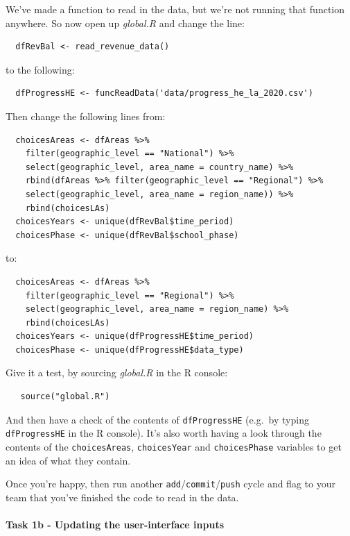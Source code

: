 \documentclass[
  12pt,
]{article}
\begin{document}
We've made a function to read in the data, but we're not running that
function anywhere. So now open up \emph{global.R} and change the line:

\begin{verbatim}
  dfRevBal <- read_revenue_data()
\end{verbatim}

to the following:

\begin{verbatim}
  dfProgressHE <- funcReadData('data/progress_he_la_2020.csv')
\end{verbatim}

Then change the following lines from:

\begin{verbatim}
  choicesAreas <- dfAreas %>%
    filter(geographic_level == "National") %>%
    select(geographic_level, area_name = country_name) %>%
    rbind(dfAreas %>% filter(geographic_level == "Regional") %>% 
    select(geographic_level, area_name = region_name)) %>%
    rbind(choicesLAs)
  choicesYears <- unique(dfRevBal$time_period)
  choicesPhase <- unique(dfRevBal$school_phase)
\end{verbatim}

to:

\begin{verbatim}
  choicesAreas <- dfAreas %>%
    filter(geographic_level == "Regional") %>% 
    select(geographic_level, area_name = region_name) %>%
    rbind(choicesLAs)
  choicesYears <- unique(dfProgressHE$time_period)
  choicesPhase <- unique(dfProgressHE$data_type)
\end{verbatim}

Give it a test, by sourcing \emph{global.R} in the R console:

\begin{verbatim}
   source("global.R")
\end{verbatim}

And then have a check of the contents of \texttt{dfProgressHE} (e.g.~by
typing \texttt{dfProgressHE} in the R console). It's also worth having a
look through the contents of the \texttt{choicesAreas},
\texttt{choicesYear} and \texttt{choicesPhase} variables to get an idea
of what they contain.

Once you're happy, then run another
\texttt{add}/\texttt{commit}/\texttt{push} cycle and flag to your team
that you've finished the code to read in the data.

\hypertarget{task-1b---updating-the-user-interface-inputs}{%
\paragraph{Task 1b - Updating the user-interface
inputs}\label{task-1b---updating-the-user-interface-inputs}}
\end{document}
